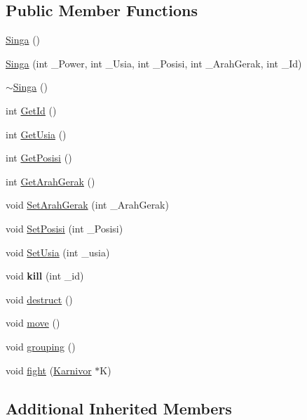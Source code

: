 \subsection*{Public Member Functions}
\begin{DoxyCompactItemize}
\item 
\hyperlink{class_singa_a2b6bc8f6bd4293c487734b5663b598ce}{Singa} ()
\item 
\hyperlink{class_singa_ad7b8861fb589c68e6a88f7295dc05fc1}{Singa} (int \+\_\+\+Power, int \+\_\+\+Usia, int \+\_\+\+Posisi, int \+\_\+\+Arah\+Gerak, int \+\_\+\+Id)
\item 
\hyperlink{class_singa_a4b2f9063d9d97cbf41f05c3558b2b9a6}{$\sim$\+Singa} ()
\item 
int \hyperlink{class_singa_aef63a0687ca6369e48130423ecfa6187}{Get\+Id} ()
\item 
int \hyperlink{class_singa_a915a753437feec3e980c1a8b57b301d7}{Get\+Usia} ()
\item 
int \hyperlink{class_singa_a54f4006c51cf3f8f0f8eb733768a08d8}{Get\+Posisi} ()
\item 
int \hyperlink{class_singa_a12c8893d99f2a8b080cc4549c2db193d}{Get\+Arah\+Gerak} ()
\item 
void \hyperlink{class_singa_a9ac8600a62bc6f33a42bfc2cd4d5d426}{Set\+Arah\+Gerak} (int \+\_\+\+Arah\+Gerak)
\item 
void \hyperlink{class_singa_adfcf66d135f5dc72060400e74173aa76}{Set\+Posisi} (int \+\_\+\+Posisi)
\item 
void \hyperlink{class_singa_a65ea5d6280ff39f313b5829130b7bcf8}{Set\+Usia} (int \+\_\+usia)
\item 
\hypertarget{class_singa_ab8af9a6523f0fe43eb04f1240c4f0804}{}void {\bfseries kill} (int \+\_\+id)\label{class_singa_ab8af9a6523f0fe43eb04f1240c4f0804}

\item 
void \hyperlink{class_singa_acdcf6232b3a5c17b85fddbac64d7f3f0}{destruct} ()
\item 
void \hyperlink{class_singa_ab4a3ab4c47f2635944e2ac4a58953377}{move} ()
\item 
void \hyperlink{class_singa_aaf195d0fe8ca4755edcc0fc6e168cbb5}{grouping} ()
\item 
void \hyperlink{class_singa_a78556ed2114916e5b00234ef931b0e58}{fight} (\hyperlink{class_karnivor}{Karnivor} $\ast$K)
\end{DoxyCompactItemize}
\subsection*{Additional Inherited Members}



